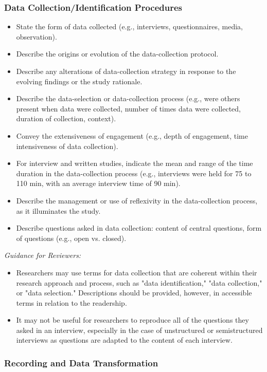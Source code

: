 \documentclass[acmsmall,screen,anonymous,review]{acmart}
\begin{document}
\subsubsection{Data Collection/Identification Procedures}
\begin{itemize}
    \item State the form of data collected (e.g., interviews, questionnaires, media, observation).
\item  Describe the origins or evolution of the data-collection protocol.
\item  Describe any alterations of data-collection strategy in response to the evolving findings
or the study rationale.
\item  Describe the data-selection or data-collection process (e.g., were others present when data
were collected, number of times data were collected, duration of collection, context).
\item  Convey the extensiveness of engagement (e.g., depth of engagement, time intensiveness
of data collection).
\item  For interview and written studies, indicate the mean and range of the time duration in
the data-collection process (e.g., interviews were held for 75 to 110 min, with an average
interview time of 90 min).
\item  Describe the management or use of reflexivity in the data-collection process, as it
illuminates the study.
\item  Describe questions asked in data collection: content of central questions, form of questions
(e.g., open vs. closed).
\end{itemize}

\textit{Guidance for Reviewers:}

\begin{itemize}
    \item Researchers may use terms for data collection that are coherent within their research approach and process, such as "data identification," "data collection," or "data selection." Descriptions should be provided, however, in accessible terms in relation to the readership.
    \item  It may not be useful for researchers to reproduce all of the questions they asked in an interview, especially in the case of unstructured or semistructured interviews as questions are adapted to the content of each interview.
\end{itemize}

\subsubsection{Recording and Data Transformation}
\end{document}
